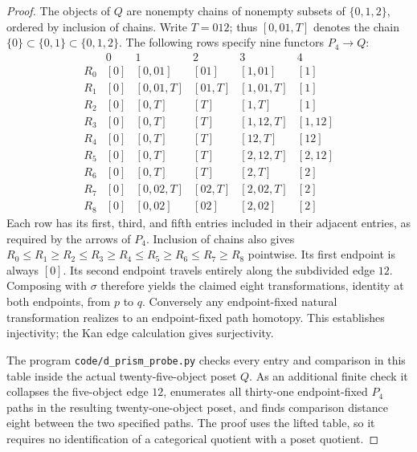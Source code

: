 \begin{proof}
The objects of $Q$ are nonempty chains of nonempty subsets of $\{0,1,2\}$, ordered by inclusion of chains. Write $T=012$; thus $[0,01,T]$ denotes the chain $\{0\}\subset\{0,1\}\subset\{0,1,2\}$. The following rows specify nine functors $P_4\to Q$:
\[
\begin{array}{c|ccccc}
 &0&1&2&3&4\\\hline
 R_0 &[0]&[0,01]&[01]&[1,01]&[1]\\
 R_1 &[0]&[0,01,T]&[01,T]&[1,01,T]&[1]\\
 R_2 &[0]&[0,T]&[T]&[1,T]&[1]\\
 R_3 &[0]&[0,T]&[T]&[1,12,T]&[1,12]\\
 R_4 &[0]&[0,T]&[T]&[12,T]&[12]\\
 R_5 &[0]&[0,T]&[T]&[2,12,T]&[2,12]\\
 R_6 &[0]&[0,T]&[T]&[2,T]&[2]\\
 R_7 &[0]&[0,02,T]&[02,T]&[2,02,T]&[2]\\
 R_8 &[0]&[0,02]&[02]&[2,02]&[2]
\end{array}
\]
Each row has its first, third, and fifth entries included in their adjacent entries, as required by the arrows of $P_4$. Inclusion of chains also gives
$R_0\le R_1\ge R_2\le R_3\ge R_4\le R_5\ge R_6\le R_7\ge R_8$ pointwise. Its first endpoint is always $[0]$. Its second endpoint travels entirely along the subdivided edge $12$. Composing with $\sigma$ therefore yields the claimed eight transformations, identity at both endpoints, from $p$ to $q$. Conversely any endpoint-fixed natural transformation realizes to an endpoint-fixed path homotopy. This establishes injectivity; the Kan edge calculation gives surjectivity.

The program \texttt{code/d\_prism\_probe.py} checks every entry and comparison in this table inside the actual twenty-five-object poset $Q$. As an additional finite check it collapses the five-object edge $12$, enumerates all thirty-one endpoint-fixed $P_4$ paths in the resulting twenty-one-object poset, and finds comparison distance eight between the two specified paths. The proof uses the lifted table, so it requires no identification of a categorical quotient with a poset quotient.
\end{proof}

